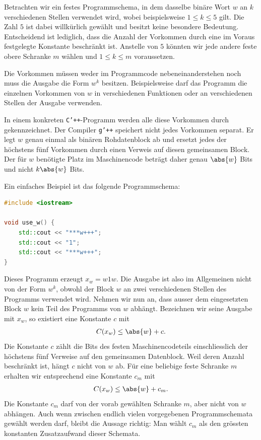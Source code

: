 \begin{myremark}\label{myremark:bounded-repetitions}
	Betrachten wir ein festes Programmschema, in dem dasselbe binäre Wort $w$ an $k$ verschiedenen Stellen verwendet wird, wobei beispielsweise $1\leq k\leq 5$ gilt. Die Zahl $5$ ist dabei willkürlich gewählt und besitzt keine besondere Bedeutung. Entscheidend ist lediglich, dass die Anzahl der Vorkommen durch eine im Voraus festgelegte Konstante beschränkt ist. Anstelle von $5$ könnten wir jede andere feste obere Schranke $m$ wählen und $1\leq k\leq m$ voraussetzen.

	Die Vorkommen müssen weder im Programmcode nebeneinanderstehen noch muss die Ausgabe die Form $w^k$ besitzen. Beispielsweise darf das Programm die einzelnen Vorkommen von $w$ in verschiedenen Funktionen oder an verschiedenen Stellen der Ausgabe verwenden.

	In einem konkreten \texttt{C'++}-Programm werden alle diese Vorkommen durch  gekennzeichnet. Der Compiler \texttt{g'++} speichert nicht jedes Vorkommen separat. Er legt $w$ genau einmal als binären Rohdatenblock ab und ersetzt jedes der höchstens fünf Vorkommen durch einen Verweis auf diesen gemeinsamen Block. Der für $w$ benötigte Platz im Maschinencode beträgt daher genau $\abs{w}$ Bits und nicht $k\abs{w}$ Bits.

	Ein einfaches Beispiel ist das folgende Programmschema:
	\begin{lstlisting}[language=C++,escapechar=!]
#include <iostream>

void use_w() {
    std::cout << "***w+++";
    std::cout << "1";
    std::cout << "***w+++";
}
	\end{lstlisting}
	Dieses Programm erzeugt $x_w=w1w$. Die Ausgabe ist also im Allgemeinen nicht von der Form $w^k$, obwohl der Block $w$ an zwei verschiedenen Stellen des Programms verwendet wird.
	Nehmen wir nun an, dass ausser dem eingesetzten Block $w$ kein Teil des Programms von $w$ abhängt. Bezeichnen wir seine Ausgabe mit $x_w$, so existiert eine Konstante $c$ mit
	\begin{align*}
		C(x_w)\leq \abs{w}+c.
	\end{align*}
	Die Konstante $c$ zählt die Bits des festen Maschinencodeteils einschliesslich der höchstens fünf Verweise auf den gemeinsamen Datenblock. Weil deren Anzahl beschränkt ist, hängt $c$ nicht von $w$ ab. Für eine beliebige feste Schranke $m$ erhalten wir entsprechend eine Konstante $c_m$ mit
	\begin{align*}
		C(x_w)\leq \abs{w}+c_m.
	\end{align*}
	Die Konstante $c_m$ darf von der vorab gewählten Schranke $m$, aber nicht von $w$ abhängen. Auch wenn zwischen endlich vielen vorgegebenen Programmschemata gewählt werden darf, bleibt die Aussage richtig: Man wählt $c_m$ als den grössten konstanten Zusatzaufwand dieser Schemata.


\end{myremark}
